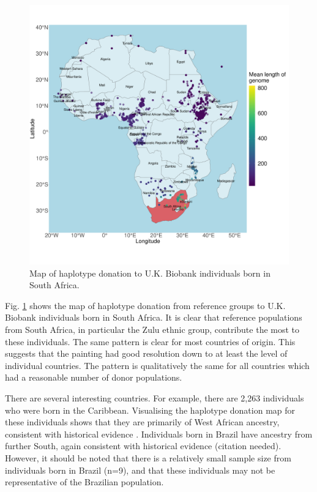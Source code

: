 \begin{figure}[htp]
    \centering
    \includegraphics[width=1.0\textwidth]{../images/chapter3/haplotype_map_SouthAfrica.pdf}
    \caption{Map of haplotype donation to U.K. Biobank individuals born in South Africa.}
    \label{fig:haplotype_map_SouthAfrica}
\end{figure}

Fig. \ref{fig:haplotype_map_SouthAfrica} shows the map of haplotype donation from reference groups to U.K. Biobank individuals born in South Africa. It is clear that reference populations from South Africa, in particular the Zulu ethnic group, contribute the most to these individuals. The same pattern is clear for most countries of origin. This suggests that the painting had good resolution down to at least the level of individual countries. The pattern is qualitatively the same for all countries which had a reasonable number of donor populations. 

There are several interesting countries. For example, there are 2,263 individuals who were born in the Caribbean. Visualising the haplotype donation map for these individuals shows that they are primarily of West African ancestry, consistent with historical evidence \cite{micheletti2020genetic}. Individuals born in Brazil have ancestry from further South, again consistent with historical evidence (citation needed). However, it should be noted that there is a relatively small sample size from individuals born in Brazil (n=9), and that these individuals may not be representative of the Brazilian population. 

